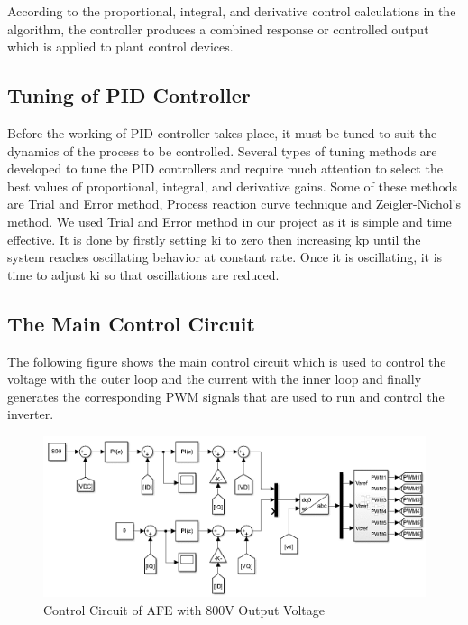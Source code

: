 \documentclass[12pt,a4paper]{book}
\begin{document}
According to the proportional, integral, and derivative control calculations in the algorithm, the controller produces a combined response or controlled output which is applied to plant control devices.

\subsection{Tuning of PID Controller}
Before the working of PID controller takes place, it must be tuned to suit the dynamics of the process to be controlled. Several types of tuning methods are developed to tune the PID controllers and require much attention to select the best values of proportional, integral, and derivative gains. Some of these methods are Trial and Error method, Process reaction curve technique and Zeigler-Nichol’s method. We used Trial and Error method in our project as it is simple and time effective. It is done by firstly setting ki to zero then increasing kp until the system reaches oscillating behavior at constant rate. Once it is oscillating, it is time to adjust ki so that oscillations are reduced.

\subsection{The Main Control Circuit}
The following figure shows the main control circuit which is used to control the voltage with the outer loop and the current with the inner loop and finally generates the corresponding PWM signals that are used to run and control the inverter.

\begin{figure}[h]
  \centering
  \includegraphics[width=15cm]{image12.png}
  \caption{Control Circuit of AFE with 800V Output Voltage}
  \label{fig:image12}
\end{figure}
\end{document}
